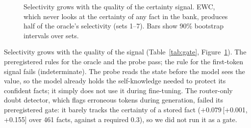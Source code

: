 \documentclass[11pt]{article}
\newcommand{\NTwo}{\ensuremath{N_2}}
\newcommand{\ci}[2]{\,[#1,\,#2]}
\begin{document}
\begin{figure}[t]
\centering
{}
\caption{Selectivity grows with the quality of the certainty signal. EWC, which never looks at the certainty of any fact in the bank, produces half of the oracle's selectivity (sets 1--7). Bars show 90\% bootstrap intervals over sets.}
\label{fig:gate}
\end{figure}

Selectivity grows with the quality of the signal (Table~\ref{tab:gate}, Figure~\ref{fig:gate}).
The preregistered rules for the oracle and the probe pass; the rule for the first-token signal fails (indeterminate).
The probe reads the state before the model sees the value, so the model already holds the self-knowledge needed to protect its confident facts; it simply does not use it during fine-tuning.
The router-only doubt detector, which flags erroneous tokens during generation, failed its preregistered gate: it barely tracks the certainty of a stored fact ($+0.079$\ci{+0.001}{+0.155} over 461 facts, against a required 0.3), so we did not run it as a gate.
\end{document}
